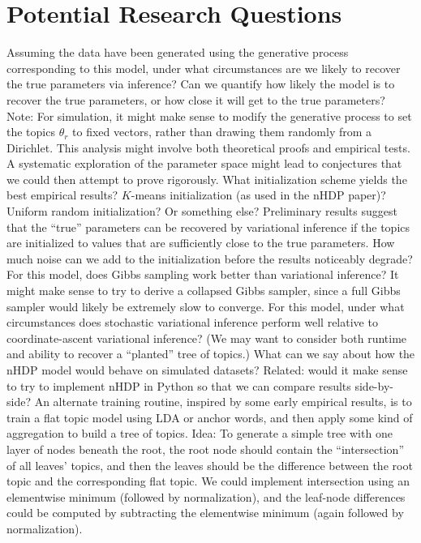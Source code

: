 \documentclass{article}
\begin{document}
\section{Potential Research Questions}

\begin{outline}
\1 Assuming the data have been generated using the generative process corresponding to this model, under what circumstances are we likely to recover the true parameters via inference?
  \2 Can we quantify how likely the model is to recover the true parameters, or how close it will get to the true parameters?
  \2 Note: For simulation, it might make sense to modify the generative process to set the topics $\theta_r$ to fixed vectors, rather than drawing them randomly from a Dirichlet.
  \2 This analysis might involve both theoretical proofs and empirical tests.  A systematic exploration of the parameter space might lead to conjectures that we could then attempt to prove rigorously.
\1 What initialization scheme yields the best empirical results?  $K$-means initialization (as used in the nHDP paper)?  Uniform random initialization?  Or something else?
\1 Preliminary results suggest that the ``true'' parameters can be recovered by variational inference if the topics are initialized to values that are sufficiently close to the true parameters.  How much noise can we add to the initialization before the results noticeably degrade?
\1 For this model, does Gibbs sampling work better than variational inference?
  \2 It might make sense to try to derive a collapsed Gibbs sampler, since a full Gibbs sampler would likely be extremely slow to converge.
\1 For this model, under what circumstances does stochastic variational inference perform well relative to coordinate-ascent variational inference?  (We may want to consider both runtime and ability to recover a ``planted'' tree of topics.)
\1 What can we say about how the nHDP model would behave on simulated datasets?
  \2 Related: would it make sense to try to implement nHDP in Python so that we can compare results side-by-side?
\1 An alternate training routine, inspired by some early empirical results, is to train a flat topic model using LDA or anchor words, and then apply some kind of aggregation to build a tree of topics.
  \2 Idea: To generate a simple tree with one layer of nodes beneath the root, the root node should contain the ``intersection'' of all leaves' topics, and then the leaves should be the difference between the root topic and the corresponding flat topic.  We could implement intersection using an elementwise minimum (followed by normalization), and the leaf-node differences could be computed by subtracting the elementwise minimum (again followed by normalization).

\end{outline}
\end{document}
